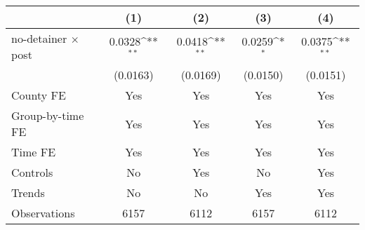 {
\def\sym#1{\ifmmode^{#1}\else\(^{#1}\)\fi}
\begin{tabular}{l*{4}{c}}
\hline\hline
                    &\multicolumn{1}{c}{(1)}         &\multicolumn{1}{c}{(2)}         &\multicolumn{1}{c}{(3)}         &\multicolumn{1}{c}{(4)}         \\
\hline
no-detainer $\times$ post&      0.0328\sym{**} &      0.0418\sym{**} &      0.0259\sym{*}  &      0.0375\sym{**} \\
                    &    (0.0163)         &    (0.0169)         &    (0.0150)         &    (0.0151)         \\
[1em]
County FE           &         Yes         &         Yes         &         Yes         &         Yes         \\
[1em]
Group-by-time FE    &         Yes         &         Yes         &         Yes         &         Yes         \\
[1em]
Time FE             &         Yes         &         Yes         &         Yes         &         Yes         \\
[1em]
Controls            &          No         &         Yes         &          No         &         Yes         \\
[1em]
Trends              &          No         &          No         &         Yes         &         Yes         \\
\hline
Observations        &        6157         &        6112         &        6157         &        6112         \\
\hline\hline
\end{tabular}
}
